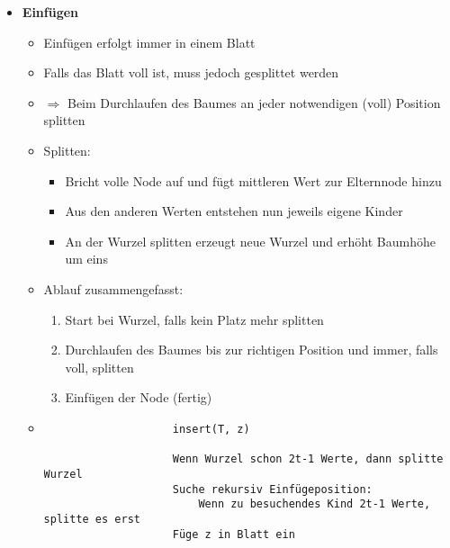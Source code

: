 \begin{itemize}
        \item \textbf{Einfügen}
            \begin{itemize}
                \item Einfügen erfolgt immer in einem Blatt
                \item Falls das Blatt voll ist, muss jedoch gesplittet werden
                \item $\Rightarrow$ Beim Durchlaufen des Baumes an jeder notwendigen (voll) Position splitten
                \item Splitten:
                    \begin{itemize}
                        \item Bricht volle Node auf und fügt mittleren Wert zur Elternnode hinzu
                        \item Aus den anderen Werten entstehen nun jeweils eigene Kinder
                        \item An der Wurzel splitten erzeugt neue Wurzel und erhöht Baumhöhe um eins
                    \end{itemize}
                \item Ablauf zusammengefasst:
                    \begin{enumerate}
                        \item Start bei Wurzel, falls kein Platz mehr splitten
                        \item Durchlaufen des Baumes bis zur richtigen Position und immer, falls voll, splitten
                        \item Einfügen der Node (fertig)
                    \end{enumerate}
                \item[]
                    \begin{verbatim}
                    insert(T, z)

                    Wenn Wurzel schon 2t-1 Werte, dann splitte Wurzel
                    Suche rekursiv Einfügeposition:
                        Wenn zu besuchendes Kind 2t-1 Werte, splitte es erst
                    Füge z in Blatt ein
                    \end{verbatim}
            \end{itemize}


\end{itemize}

